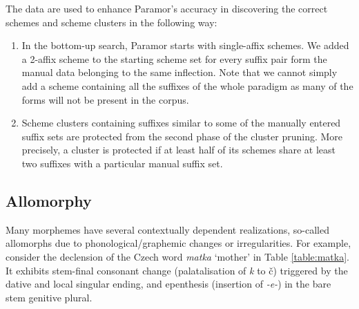 \documentclass[11pt]{article}
\newcommand{\e}[1]{\textit{#1}} %
\newcommand{\todojd}[1]{} %
\begin{document}
\noindent
The data are used to enhance Paramor's accuracy in discovering the correct schemes and scheme clusters in the following way:
\begin{enumerate}
\item In the bottom-up search, Paramor starts with single-affix schemes. We added a 2-affix scheme to the starting scheme set for every suffix pair form the manual data belonging to the same inflection. Note that we cannot simply add a scheme containing all the suffixes of the whole paradigm as many of the forms will not be present in the corpus.
    
\item Scheme clusters containing suffixes similar to some of the manually entered suffix sets are protected from the second phase of the cluster pruning. More precisely, a cluster is protected if at least half of its schemes share at least two suffixes with a particular manual suffix set.
\todojd{Is there any reason why half and two, and not, say, 60\% and 3?  \textbf{RK:} Not really -- similar criterion is often used in Paramor so I used it here as well.}



\end{enumerate}



\subsection{Allomorphy}


\noindent
Many morphemes have several contextually dependent realizations,  so-called
allomorphs due to phonological/graphemic changes or irregularities. For example, consider the declension of the Czech word \e{matka} `mother' in Table \ref{table:matka}. It exhibits stem-final conso\-nant chan\-ge (palatalisation of \e{k} to \v{c}) triggered by the dative and local singular ending, and epenthesis (insertion of \e{-e-}) in the bare stem genitive plural.
\end{document}
